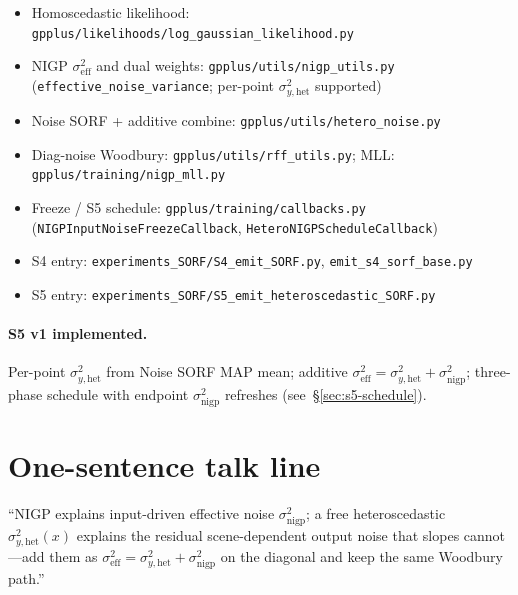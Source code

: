 \documentclass[11pt]{article}
\newcommand{\sighet}{\sigma_{y,\mathrm{het}}^{2}}%
\newcommand{\signigp}{\sigma_{\mathrm{nigp}}^{2}}%
\newcommand{\sigeff}{\sigma_{\mathrm{eff}}^{2}}%
\begin{document}
\begin{itemize}[leftmargin=1.2em,itemsep=0.2em]
  \item Homoscedastic likelihood:
        \texttt{gpplus/likelihoods/log\_gaussian\_likelihood.py}
  \item NIGP $\sigeff$ and dual weights:
        \texttt{gpplus/utils/nigp\_utils.py}
        (\texttt{effective\_noise\_variance}; per-point $\sighet$ supported)
  \item Noise SORF + additive combine:
        \texttt{gpplus/utils/hetero\_noise.py}
  \item Diag-noise Woodbury:
        \texttt{gpplus/utils/rff\_utils.py};
        MLL: \texttt{gpplus/training/nigp\_mll.py}
  \item Freeze / S5 schedule:
        \texttt{gpplus/training/callbacks.py}
        (\texttt{NIGPInputNoiseFreezeCallback}, \texttt{HeteroNIGPScheduleCallback})
  \item S4 entry:
        \texttt{experiments\_SORF/S4\_emit\_SORF.py},
        \texttt{emit\_s4\_sorf\_base.py}
  \item S5 entry:
        \texttt{experiments\_SORF/S5\_emit\_heteroscedastic\_SORF.py}
\end{itemize}

\paragraph{S5 v1 implemented.}
Per-point $\sighet$ from Noise SORF MAP mean; additive $\sigeff=\sighet+\signigp$;
three-phase schedule with endpoint $\signigp$ refreshes
(see~\S\ref{sec:s5-schedule}).

\section*{One-sentence talk line}

``NIGP explains input-driven effective noise $\signigp$; a free heteroscedastic
$\sighet(x)$ explains the residual scene-dependent output noise that slopes cannot---add
them as $\sigeff=\sighet+\signigp$ on the diagonal and keep the same Woodbury path.''



\end{document}
